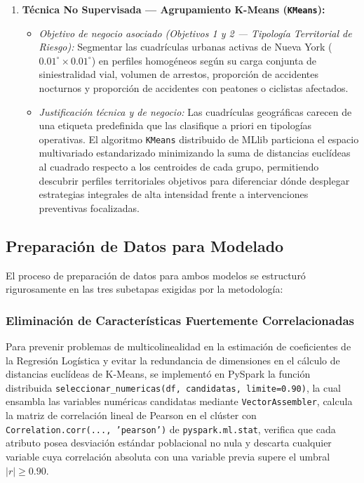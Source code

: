 \documentclass[11pt,a4paper]{article}
\begin{document}
\begin{enumerate}
    \item \textbf{Técnica No Supervisada --- Agrupamiento K-Means (\texttt{KMeans}):}
    \begin{itemize}
        \item \textit{Objetivo de negocio asociado (Objetivos 1 y 2 --- Tipología Territorial de Riesgo):} Segmentar las cuadrículas urbanas activas de Nueva York ($0.01^\circ \times 0.01^\circ$) en perfiles homogéneos según su carga conjunta de siniestralidad vial, volumen de arrestos, proporción de accidentes nocturnos y proporción de accidentes con peatones o ciclistas afectados.
        \item \textit{Justificación técnica y de negocio:} Las cuadrículas geográficas carecen de una etiqueta predefinida que las clasifique a priori en tipologías operativas. El algoritmo \texttt{KMeans} distribuido de MLlib particiona el espacio multivariado estandarizado minimizando la suma de distancias euclídeas al cuadrado respecto a los centroides de cada grupo, permitiendo descubrir perfiles territoriales objetivos para diferenciar dónde desplegar estrategias integrales de alta intensidad frente a intervenciones preventivas focalizadas.
    \end{itemize}
\end{enumerate}

\subsection{Preparación de Datos para Modelado}
\label{subsec:prep_modelado_num4}

El proceso de preparación de datos para ambos modelos se estructuró rigurosamente en las tres subetapas exigidas por la metodología:

\subsubsection{Eliminación de Características Fuertemente Correlacionadas}
\label{subsubsec:num4a_correlacion}

Para prevenir problemas de multicolinealidad en la estimación de coeficientes de la Regresión Logística y evitar la redundancia de dimensiones en el cálculo de distancias euclídeas de K-Means, se implementó en PySpark la función distribuida \texttt{seleccionar\_numericas(\allowbreak df, candidatas, limite=0.90)}, la cual ensambla las variables numéricas candidatas mediante \texttt{VectorAssembler}, calcula la matriz de correlación lineal de Pearson en el clúster con \texttt{Correlation.corr(..., 'pearson')} de \texttt{pyspark.ml.stat}, verifica que cada atributo posea desviación estándar poblacional no nula y descarta cualquier variable cuya correlación absoluta con una variable previa supere el umbral $|r| \ge 0.90$.
\end{document}
